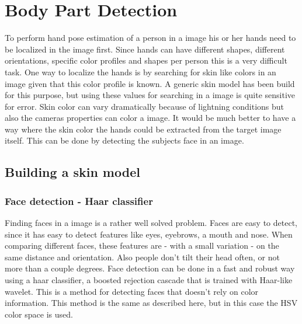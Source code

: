 
\chapter{Body Part Detection}
\label{ch:bodyparts}

To perform hand pose estimation of a person in a image his or her hands need to be localized in the image first. Since hands can have different shapes, different orientations, specific color profiles and shapes per person this is a very difficult task. One way to localize the hands is by searching for skin like colors in an image given that this color profile is known. A generic skin model has been build for this purpose\cite{Jones99statisticalcolor}, but using these values for searching in a image is quite sensitive for error. Skin color can vary dramatically because of lightning conditions but also the cameras properties can color a image. It would be much better to have a way where the skin color the hands could be extracted from the target image itself. This can be done by detecting the subjects face in an image.

\section{Building a skin model}
\label{sec:skinmodel}

\subsection*{Face detection - Haar classifier}
Finding faces in a image is a rather well solved problem. Faces are easy to detect, since it has easy to detect features like eyes, eyebrows, a mouth and nose. When comparing different faces, these features are - with a small variation - on the same distance and orientation. Also people don't tilt their head often, or not more than a couple degrees. Face detection can be done in a fast and robust way using a haar classifier, a boosted rejection cascade that is trained with Haar-like wavelet\cite{Lienhart02anextended}. This is a method for detecting faces that doesn't rely on color information. This method is the same as described here\cite{Stenger06template-basedhand}, but in this case the HSV color space is used.


